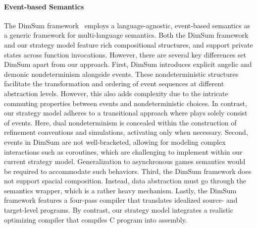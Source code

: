 \documentclass[acmsmall,nonacm]{acmart}
\begin{document}
\paragraph{Event-based Semantics}
The DimSum framework~\cite{dimsum}
employs a language-agnostic, event-based semantics
as a generic framework
for multi-language semantics.
Both the DimSum framework
and our strategy model
feature rich compositional structures,
and support private states
across function invocations.
However, there are several key differences
set DimSum apart
from our approach.
First,
DimSum introduces
explicit angelic and demonic nondeterminism
alongside events.
These nondeterministic structures
facilitate the transformation and ordering
of event sequences
at different abstraction levels.
However,
this also adds complexity
due to the intricate
commuting properties between events
and nondeterministic choices.
In contrast,
our strategy model
adheres to a transitional approach
where plays solely consist of events.
Here, dual nondeterminism
is concealed within the construction of
refinement conventions and simulations,
activating only when necessary.
Second,
events in DimSum are not
well-bracketed,
allowing for modeling complex interactions
such as coroutines,
which are challenging to implement
within our current strategy model.
Generalization to
asynchronous games semantics
would be required to accommodate such behaviors.
Third,
the DimSum framework
does not support spacial composition.
Instead,
data abstraction must go through
the semantics wrapper,
which is a rather heavy mechanism.
Lastly,
the DimSum framework
features a four-pass compiler
that translates idealized source-
and target-level programs.
By contrast,
our strategy model
integrates a realistic optimizing compiler
that compiles C program into assembly.


%
%
%
\end{document}
